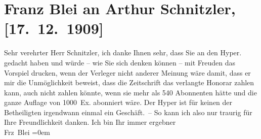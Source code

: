 

         
         \newcommand{\erwaehntePersonen}{Personen: Hans von Weber}
         \newcommand{\erwaehnteInstitutionen}{Institutionen: Hyperion}
         \newcommand{\erwaehnteOrte}{Orte: München, Wien}
         \newcommand{\erwaehnteWerke}{Werke: Der junge Medardus. Dramatische Historie in einem Vorspiel und fünf Aufzügen}
               \section[Franz Blei an Arthur Schnitzler, {[}17. 12. 1909{]}]{ Franz Blei an Arthur Schnitzler, {[}17. 12. 1909{]}}\nopagebreak{}\rehead{ }\begin{ledgroupsized}[t]{13cm}\normalsize\beginnumbering \toendnotes[C]{\smallbreak\pagebreak[2]} 
\toendnotes[C]{\smallbreak}\pstart{}{\pb}Sehr verehrter Herr
                        Schnitzler,\pend\pstart
           ich danke Ihnen sehr, dass Sie an den Hyper.
                    gedacht haben und würde – wie Sie sich denken können – mit Freuden das Vorspiel drucken, wenn der
                        Verleger nicht anderer
                    Meinung wäre damit, dass er mir die Unmöglichkeit beweist, dass die Zeitschrift
                    das verlangte Honorar zahlen kann, auch nicht zahlen könnte, wenn sie mehr als
                    540 Abonnenten hätte und die ganze Auflage von 1000 Ex. abonniert wäre. Der Hyper ist für keinen der Betheiligten
                    irgendwann einmal ein Geschäft. – So kann ich also nur traurig für Ihre
                    Freundlichkeit danken.\pend
           \pstart
           Ich bin Ihr immer ergebner{\\[\baselineskip]}\spacefill\mbox{Frz Blei}\pend
           \leftskip=0em{}
         
         \endnumbering{}\end{ledgroupsized}  \newcommand{\dateiname}{L01905}\newcommand{\titel}{Franz Blei an Arthur Schnitzler, [17. 12. 1909]}\newcommand{\editorInnen}{Martin Anton Müller und Gerd-Hermann Susen}
      